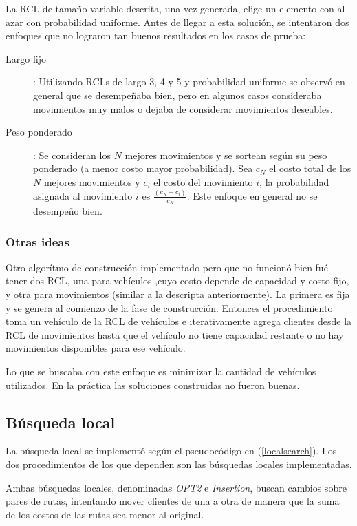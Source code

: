 \documentclass{article}
\begin{document}
  La RCL de tamaño variable descrita, una vez generada, elige un elemento con al azar con probabilidad uniforme. Antes de llegar a esta solución, se intentaron dos enfoques que no lograron tan buenos resultados en los casos de prueba:
  \begin{description}
    \item[Largo fijo]: Utilizando RCLs de largo 3, 4 y 5 y probabilidad uniforme se observó en general que se desempeñaba bien, pero en algunos casos consideraba movimientos muy malos o dejaba de considerar movimientos deseables.
    \item[Peso ponderado]: Se consideran los $N$ mejores movimientos y se sortean según su peso ponderado (a menor costo mayor probabilidad). Sea $c_N$ el costo total de los $N$ mejores movimientos y $c_i$ el costo del movimiento $i$, la probabilidad asignada al movimiento $i$ es $\frac{(c_N - c_i)}{c_N}$. Este enfoque en general no se desempeño bien.
  \end{description}

  \subsubsection*{Otras ideas}

  Otro algorítmo de construcción implementado pero que no funcionó bien fué tener dos RCL, una para vehículos ,cuyo costo depende de capacidad y costo fijo, y otra para movimientos (similar a la descripta anteriormente).
  La primera es fija y se genera al comienzo de la fase de construcción. Entonces el procedimiento toma un vehículo de la RCL de vehículos e iterativamente agrega clientes desde la RCL de movimientos hasta que el vehículo no tiene capacidad restante o no hay movimientos disponibles para ese vehículo.

  Lo que se buscaba con este enfoque es minimizar la cantidad de vehículos utilizados. En la práctica las soluciones construidas no fueron buenas.

  \subsection*{Búsqueda local}

  La búsqueda local se implementó según el pseudocódigo en (\ref{localsearch}). Los dos procedimientos de los que dependen son las búsquedas locales implementadas.

  Ambas búsquedas locales, denominadas {\it OPT2} e {\it Insertion}, buscan cambios sobre pares de rutas, intentando mover clientes de una a otra de manera que la suma de los costos de las rutas sea menor al original.
\end{document}
